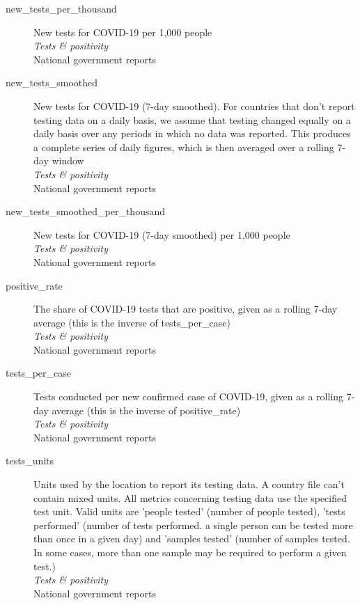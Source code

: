 \begin{description}
    \item[new\_tests\_per\_thousand] 
    New tests for COVID-19 per 1,000 people\\
    \emph{\footnotesize{Tests \& positivity}}\\
    \footnotesize{National government reports}\\

    \item[new\_tests\_smoothed] 
    New tests for COVID-19 (7-day smoothed). For countries that don't report testing data on a daily basis, we assume that testing changed equally on a daily basis over any periods in which no data was reported. This produces a complete series of daily figures, which is then averaged over a rolling 7-day window\\
    \emph{\footnotesize{Tests \& positivity}}\\
    \footnotesize{National government reports}\\

    \item[new\_tests\_smoothed\_per\_thousand] 
    New tests for COVID-19 (7-day smoothed) per 1,000 people\\
    \emph{\footnotesize{Tests \& positivity}}\\
    \footnotesize{National government reports}\\

    \item[positive\_rate] 
    The share of COVID-19 tests that are positive, given as a rolling 7-day average (this is the inverse of tests\_per\_case)\\
    \emph{\footnotesize{Tests \& positivity}}\\
    \footnotesize{National government reports}\\

    \item[tests\_per\_case] 
    Tests conducted per new confirmed case of COVID-19, given as a rolling 7-day average (this is the inverse of positive\_rate)\\
    \emph{\footnotesize{Tests \& positivity}}\\
    \footnotesize{National government reports}\\

    \item[tests\_units] 
    Units used by the location to report its testing data. A country file can't contain mixed units. All metrics concerning testing data use the specified test unit. Valid units are 'people tested' (number of people tested), 'tests performed' (number of tests performed. a single person can be tested more than once in a given day) and 'samples tested' (number of samples tested. In some cases, more than one sample may be required to perform a given test.)\\
    \emph{\footnotesize{Tests \& positivity}}\\
    \footnotesize{National government reports}\\


\end{description}
